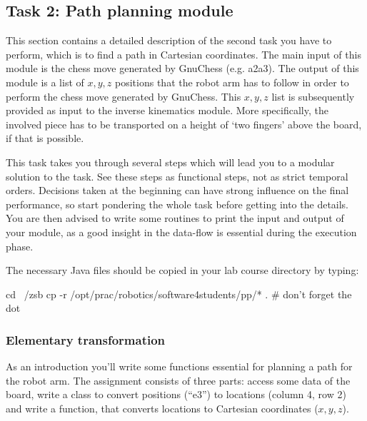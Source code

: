 \documentclass[10pt]{scrartcl}
\begin{document}

\subsection{Task 2: Path planning module}
\label{sec:Pathplanning}

This section contains a detailed description of the second task you have
to perform, which is to find a path in Cartesian coordinates. The main
input of this module is the chess move generated by GnuChess (e.g.
a2a3). The output of this module is a list of $x,y,z$ positions that the
robot arm has to follow in order to perform the chess move generated by
GnuChess. This $x,y,z$ list is subsequently provided as input to the
inverse kinematics module. More specifically, the involved piece has to
be transported on a height of `two fingers' above the board, if that is
possible.

This task takes you through several steps which will lead you to a
modular solution to the task. See these steps as functional steps, not
as strict temporal orders. Decisions taken at the beginning can have
strong influence on the final performance, so start pondering
the whole task before getting into the details.  You are then advised to
write some routines to print the input and output of your module, as a
good insight in the data-flow is essential during the execution phase.

The necessary Java files should be copied in your lab course
directory by typing:

\begin{verbatimtab}
cd ~/zsb
cp -r /opt/prac/robotics/software4students/pp/* . # don't forget the dot
\end{verbatimtab}

\subsubsection{Elementary transformation}

As an introduction you'll write some functions essential for planning a
path for the robot arm. The assignment consists of three parts: access
some data of the board, write a class to convert positions (``e3'') to
locations (column 4, row 2) and write a function, that  converts locations to
Cartesian coordinates ($x,y,z$).
\end{document}
